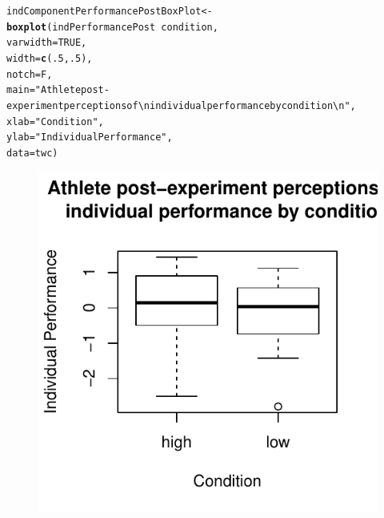 \documentclass[english]{article}\usepackage[]{graphicx}\usepackage[]{color}
\makeatletter
\def\maxwidth{ %
  \ifdim\Gin@nat@width>\linewidth
    \linewidth
  \else
    \Gin@nat@width
  \fi
}
\newcommand{\hlnum}[1]{\textcolor[rgb]{0.686,0.059,0.569}{#1}}%
\newcommand{\hlstr}[1]{\textcolor[rgb]{0.192,0.494,0.8}{#1}}%
\newcommand{\hlopt}[1]{\textcolor[rgb]{0,0,0}{#1}}%
\newcommand{\hlstd}[1]{\textcolor[rgb]{0.345,0.345,0.345}{#1}}%
\newcommand{\hlkwb}[1]{\textcolor[rgb]{0.69,0.353,0.396}{#1}}%
\newcommand{\hlkwc}[1]{\textcolor[rgb]{0.333,0.667,0.333}{#1}}%
\newcommand{\hlkwd}[1]{\textcolor[rgb]{0.737,0.353,0.396}{\textbf{#1}}}%
\newenvironment{kframe}{%
 \def\at@end@of@kframe{}%
 \ifinner\ifhmode%
  \def\at@end@of@kframe{\end{minipage}}%
  \begin{minipage}{\columnwidth}%
 \fi\fi%
 \def\FrameCommand##1{\hskip\@totalleftmargin \hskip-\fboxsep
 \colorbox{shadecolor}{##1}\hskip-\fboxsep
     \hskip-\linewidth \hskip-\@totalleftmargin \hskip\columnwidth}%
 \MakeFramed {\advance\hsize-\width
   \@totalleftmargin\z@ \linewidth\hsize
   \@setminipage}}%
 {\par\unskip\endMakeFramed%
 \at@end@of@kframe}
\newenvironment{knitrout}{}{} %
\makeatother
\begin{document}
\begin{knitrout}
\color{fgcolor}\begin{kframe}
\begin{alltt}
\hlstd{indComponentPerformancePostBoxPlot} \hlkwb{<-} \hlkwd{boxplot}\hlstd{(indPerformancePost} \hlopt{~} \hlstd{condition,}
                                        \hlkwc{varwidth} \hlstd{=} \hlnum{TRUE}\hlstd{,}
                                        \hlkwc{width} \hlstd{=} \hlkwd{c}\hlstd{(}\hlnum{.5}\hlstd{,}\hlnum{.5}\hlstd{),}
                                        \hlkwc{notch} \hlstd{= F,}
                                        \hlkwc{main} \hlstd{=} \hlstr{"Athlete post-experiment perceptions of \textbackslash{}n individual performance by condition \textbackslash{}n"}\hlstd{,}
                                        \hlkwc{xlab} \hlstd{=} \hlstr{"Condition"}\hlstd{,}
                                        \hlkwc{ylab} \hlstd{=} \hlstr{"Individual Performance"}\hlstd{,}
                                        \hlkwc{data} \hlstd{= twc)}
\end{alltt}
\end{kframe}\begin{figure}

{\centering \includegraphics[width=\maxwidth]{figure/indComponentPerformancePostBoxPlot-1} 

}

\end{figure}


\end{knitrout}
\end{document}
